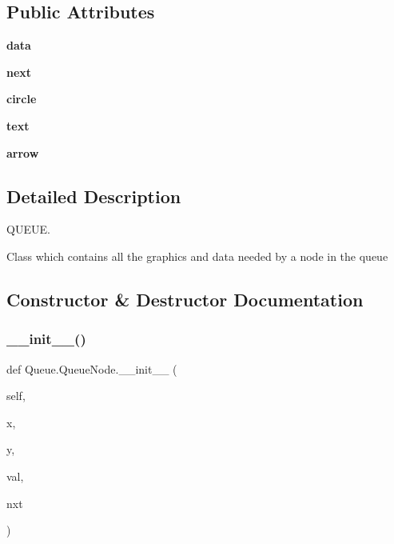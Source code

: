 \subsection*{Public Attributes}
\begin{DoxyCompactItemize}
\item 
\mbox{\label{class_queue_1_1_queue_node_aa9448b7ef31d8dd61adb504ccf7b1c44}} 
{\bfseries data}
\item 
\mbox{\label{class_queue_1_1_queue_node_a736cdbadd2c72609a9964dd149054db0}} 
{\bfseries next}
\item 
\mbox{\label{class_queue_1_1_queue_node_ac113a4d52ea51f0c6fcb65b30e6e0761}} 
{\bfseries circle}
\item 
\mbox{\label{class_queue_1_1_queue_node_a3e732e4728a03dd3c333782519efb320}} 
{\bfseries text}
\item 
\mbox{\label{class_queue_1_1_queue_node_a762acb0de1bf2321d766376c383ffbb0}} 
{\bfseries arrow}
\end{DoxyCompactItemize}


\subsection{Detailed Description}
Q\+U\+E\+UE. 

Class which contains all the graphics and data needed by a node in the queue 

\subsection{Constructor \& Destructor Documentation}
\mbox{\label{class_queue_1_1_queue_node_acfe34780ae926af46ebe32a58c8e030c}} 
\subsubsection{\texorpdfstring{\+\_\+\+\_\+init\+\_\+\+\_\+()}{\_\_init\_\_()}}
{\footnotesize\ttfamily def Queue.\+Queue\+Node.\+\_\+\+\_\+init\+\_\+\+\_\+ (\begin{DoxyParamCaption}\item[{}]{self,  }\item[{}]{x,  }\item[{}]{y,  }\item[{}]{val,  }\item[{}]{nxt }\end{DoxyParamCaption})}



